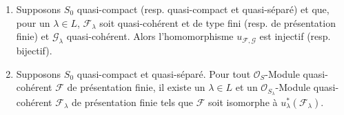 \begin{theorem}[8.5.2]
\label{IV.8.5.2-fr}
\begin{enumerate}[label=(\roman*)]
  \item Supposons $S_0$ quasi-compact (resp. quasi-compact et quasi-séparé) et
  que, pour un $\lambda\in L$, $\mathcal F_\lambda$ soit quasi-cohérent et de
  type fini (resp. de présentation finie) et $\mathcal G_\lambda$
  quasi-cohérent. Alors l'homomorphisme $u_{\mathcal F,\mathcal G}$ est
  injectif (resp. bijectif).

  \item Supposons $S_0$ quasi-compact et quasi-séparé. Pour tout
  $\mathcal O_S$-Module quasi-cohérent $\mathcal F$ de présentation finie, il
  existe un $\lambda\in L$ et un $\mathcal O_{S_\lambda}$-Module
  quasi-cohérent $\mathcal F_\lambda$ de présentation finie tels que
  $\mathcal F$ soit isomorphe à $u_\lambda^*(\mathcal F_\lambda)$.
\end{enumerate}
\end{theorem}


